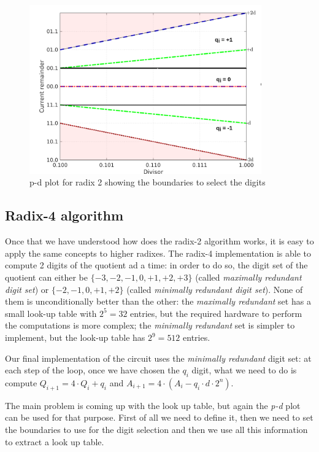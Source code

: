 \begin{figure}
    \centering
    \includegraphics[width=100mm]{images/pd_plot_r2_q.png}
    \caption{p-d plot for radix 2 showing the boundaries to select the digits}
    \label{fig:pd_radix_2_dig}
\end{figure}

\subsection{Radix-4 algorithm}
Once that we have understood how does the radix-2 algorithm works, it is easy to apply the same concepts to higher radixes. 
The radix-4 implementation is able to compute 2 digits of the quotient ad a time: in order to do so, the digit set of the quotient can either be $\{-3, -2, -1, 0, +1, +2, +3\}$ (called \textit{maximally redundant digit set}) or $\{-2, -1, 0, +1, +2\}$ (called \textit{minimally redundant digit set}). 
None of them is unconditionally better than the other: the \textit{maximally redundant} set  has a small look-up table with $2^5=32$ entries, but the required hardware to perform the computations is more complex; the \textit{minimally redundant} set is simpler to implement, but the look-up table has $2^9=512$ entries. 

Our final implementation of the circuit uses the \textit{minimally redundant} digit set: at each step of the loop, once we have chosen the $q_i$ digit, what we need to do is compute $Q_{i+1} = 4 \cdot Q_i + q_i$ and $A_{i+1} = 4 \cdot (A_i - q_i \cdot d \cdot 2^n)$.

The main problem is coming up with the look up table, but again the \textit{p-d} plot can be used for that purpose. 
First of all we need to define it, then we need to set the boundaries to use for the digit selection and then we use all this information to extract a look up table. 

